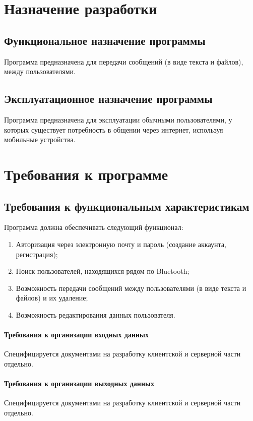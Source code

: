 \documentclass[techtask]{espd}
\begin{document}
\section{Назначение разработки}
\subsection{Функциональное назначение программы}
Программа предназначена для передачи сообщений (в виде текста и файлов), между пользователями.

\subsection{Эксплуатационное назначение программы}
Программа предназначена для эксплуатации обычными пользователями, у которых существует потребность в общении через интернет, используя мобильные устройства.

\section{Требования к программе}
\subsection{Требования к функциональным характеристикам}
Программа должна обеспечивать следующий функционал:

\begin{enumerate}
\item Авторизация через электронную почту и пароль (создание аккаунта, регистрация);
\item Поиск пользователей, находящихся рядом по Bluetooth;
\item Возможность передачи сообщений между пользователями (в виде текста и файлов) и их удаление;
\item Возможность редактирования данных пользователя.
\end{enumerate}

\paragraph{Требования к организации входных данных}
Специфицируется документами на разработку клиентской и серверной части отдельно.

\paragraph{Требования к организации выходных данных}
Специфицируется документами на разработку клиентской и серверной части отдельно.
\end{document}
